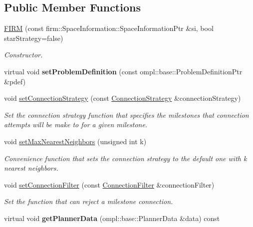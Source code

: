\subsection*{\-Public \-Member \-Functions}
\begin{DoxyCompactItemize}
\item 
\hypertarget{class_f_i_r_m_acc62503ed6d1d9674e3b18102fb0dd98}{\hyperlink{class_f_i_r_m_acc62503ed6d1d9674e3b18102fb0dd98}{\-F\-I\-R\-M} (const firm\-::\-Space\-Information\-::\-Space\-Information\-Ptr \&si, bool star\-Strategy=false)}\label{class_f_i_r_m_acc62503ed6d1d9674e3b18102fb0dd98}

\begin{DoxyCompactList}\small\item\em \-Constructor. \end{DoxyCompactList}\item 
\hypertarget{class_f_i_r_m_a09a7ff97d8202a82ca7f6dddfd7ba185}{virtual void {\bfseries set\-Problem\-Definition} (const ompl\-::base\-::\-Problem\-Definition\-Ptr \&pdef)}\label{class_f_i_r_m_a09a7ff97d8202a82ca7f6dddfd7ba185}

\item 
void \hyperlink{class_f_i_r_m_a8017d1847e682f39c2cbce33e904af57}{set\-Connection\-Strategy} (const \hyperlink{class_f_i_r_m_a15cfbcaf52c0bdd5e6c1a969bbf7ea1e}{\-Connection\-Strategy} \&connection\-Strategy)
\begin{DoxyCompactList}\small\item\em \-Set the connection strategy function that specifies the milestones that connection attempts will be make to for a given milestone. \end{DoxyCompactList}\item 
\hypertarget{class_f_i_r_m_a2a87b6c094c21b956a469a2b69cd387c}{void \hyperlink{class_f_i_r_m_a2a87b6c094c21b956a469a2b69cd387c}{set\-Max\-Nearest\-Neighbors} (unsigned int k)}\label{class_f_i_r_m_a2a87b6c094c21b956a469a2b69cd387c}

\begin{DoxyCompactList}\small\item\em \-Convenience function that sets the connection strategy to the default one with k nearest neighbors. \end{DoxyCompactList}\item 
void \hyperlink{class_f_i_r_m_a3f85ba51a7c3b62b75df7f7c16064cec}{set\-Connection\-Filter} (const \hyperlink{class_f_i_r_m_a2482eee2e5248d5bff3b3b56e5a593b3}{\-Connection\-Filter} \&connection\-Filter)
\begin{DoxyCompactList}\small\item\em \-Set the function that can reject a milestone connection. \end{DoxyCompactList}\item 
\hypertarget{class_f_i_r_m_aedf1364d36f3934d5e47656a6d8e7d65}{virtual void {\bfseries get\-Planner\-Data} (ompl\-::base\-::\-Planner\-Data \&data) const }\label{class_f_i_r_m_aedf1364d36f3934d5e47656a6d8e7d65}


\end{DoxyCompactItemize}
